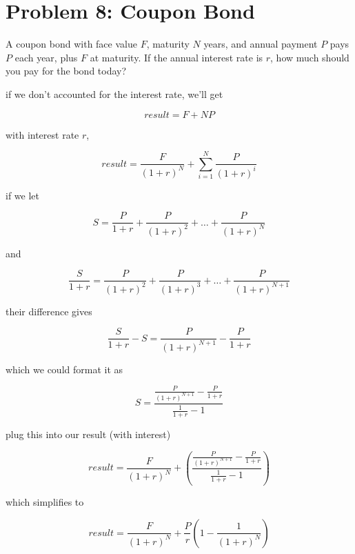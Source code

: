 \vspace{1em}
\hrulefill

\section*{Problem 8: Coupon Bond}
A coupon bond with face value $F$, maturity $N$ years, and annual payment $P$ pays $P$ each year, plus $F$ at maturity. If the annual interest rate is $r$, how much should you pay for the bond today?

\medskip
\solution

if we don't accounted for the interest rate, we'll
  get

  \[
  result = F + NP
  \]

  with interest rate $r$,

  \[
  result = \frac{F}{(1+r)^N} + \sum_{i=1}^N \frac{P}
  {(1+r)^i}
  \]

  if we let

  \[
  S = \frac{P}{1+r} + \frac{P}{(1+r)^2} + \dots +
  \frac{P}{(1+r)^N}
  \]

  and

  \[
  \frac{S}{1+r} = \frac{P}{(1+r)^2} + \frac{P}
  {(1+r)^3} + \dots + \frac{P}{(1+r)^{N+1}}
  \]

  their difference gives

  \[
  \frac{S}{1+r} - S = \frac{P}{(1+r)^{N+1}} - \frac{P}
  {1+r}
  \]

  which we could format it as

  \[
  S = \frac{\frac{P}{(1+r)^{N+1}} - \frac{P}{1+r}}
  {\frac{1}{1+r} - 1}
  \]

  plug this into our result (with interest)

  \[
  result = \frac{F}{(1+r)^N} + \left( \frac{\frac{P}
  {(1+r)^{N+1}} - \frac{P}{1+r}}{\frac{1}{1+r} - 1}
  \right)
  \]

  which simplifies to

  \[
  \boxed{result = \frac{F}{(1+r)^N} + \frac{P}{r}\left(1 -
  \frac{1}{(1+r)^N}\right)}
  \]


